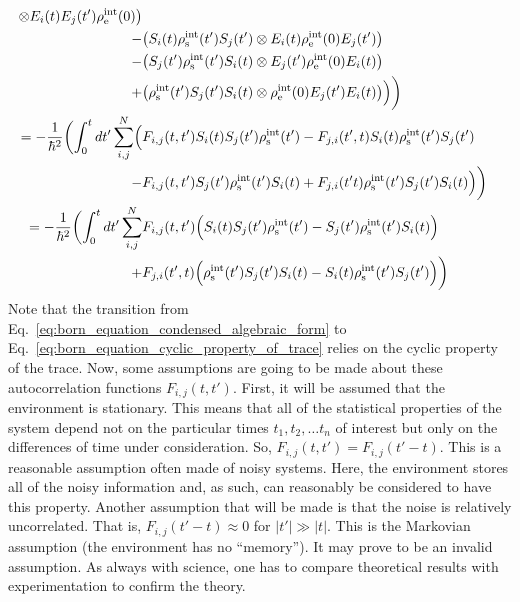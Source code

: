 \documentclass{article}
\begin{document}
\begin{align}
          \otimes E_{i}(t) E_{j}(t') \rho^{\textrm{int}}_{\textrm{e}}(0) \bigr)
          \label{eq:born_equation_condensed_algebraic_form} \\
          -& \bigl( S_{i}(t) \rho^{\textrm{int}}_{\textrm{s}}(t') S_{j}(t')
         \otimes E_{i}(t) \rho^{\textrm{int}}_{\textrm{e}}(0) E_{j}(t') \bigr)
         \nonumber \\
         -& \bigl( S_{j}(t')\rho^{\textrm{int}}_{\textrm{s}}(t') S_{i}(t)
         \otimes E_{j}(t') \rho^{\textrm{int}}_{\textrm{e}}(0) E_{i}(t) \bigr)
         \nonumber \\
         +& \bigl( \rho^{\textrm{int}}_{\textrm{s}}(t') S_{j}(t') S_{i}(t)
         \otimes \rho^{\textrm{int}}_{\textrm{e}}(0) E_{j}(t') E_{i}(t) \bigr)
          \Bigr) \biggr) \nonumber \\
       = -\frac{1}{\hbar^{2}} \biggl( \int_{0}^{t} dt' \sum^{N}_{i,j}
          \Bigl(
             & F_{i,j}(t,t') S_{i}(t) S_{j}(t') \rho^{\textrm{int}}_{\textrm{s}}(t')
          - F_{j,i}(t',t) S_{i}(t) \rho^{\textrm{int}}_{\textrm{s}}(t') S_{j}(t')
          \label{eq:born_equation_cyclic_property_of_trace} \\
          -& F_{i,j}(t,t') S_{j}(t')\rho^{\textrm{int}}_{\textrm{s}}(t') S_{i}(t)
          + F_{j,i}(t't) \rho^{\textrm{int}}_{\textrm{s}}(t') S_{j}(t') S_{i}(t)
          \Bigr) \biggr) \nonumber \\
       = -\frac{1}{\hbar^{2}} \biggl( \int_{0}^{t} dt' \sum^{N}_{i,j}
          & F_{i,j}(t,t') \Bigl(
             S_{i}(t) S_{j}(t') \rho^{\textrm{int}}_{\textrm{s}}(t')
          - S_{j}(t')\rho^{\textrm{int}}_{\textrm{s}}(t') S_{i}(t)
       \Bigr) \\
       + & F_{j,i}(t',t) \Bigr(
          \rho^{\textrm{int}}_{\textrm{s}}(t') S_{j}(t') S_{i}(t)
          - S_{i}(t) \rho^{\textrm{int}}_{\textrm{s}}(t') S_{j}(t')
            \Bigr) \biggr) \nonumber
\end{align}
Note that the transition from
Eq.~\ref{eq:born_equation_condensed_algebraic_form} to
Eq.~\ref{eq:born_equation_cyclic_property_of_trace} relies on the cyclic
property of the trace. Now, some assumptions are going to be made about these
autocorrelation functions $ F_{i,j}(t,t') $. First, it will be assumed that the
environment is stationary. This means that all of the statistical properties of
the system depend not on the particular times $ t_{1}, t_{2}, \ldots t_{n} $ of
interest but only on the differences of time under consideration. So, $
F_{i,j}(t,t') = F_{i,j}(t'-t) $. This is a reasonable assumption often made of
noisy systems.  Here, the environment stores all of the noisy information and,
as such, can reasonably be considered to have this property. Another assumption
that will be made is that the noise is relatively uncorrelated. That is, $
F_{i,j}(t'-t) \approx 0 $ for $ \left| t' \right| \gg \left| t \right| $. This
is the Markovian assumption (the environment has no ``memory''). It may prove to
be an invalid assumption. As always with science, one has to compare theoretical results
with experimentation to confirm the theory.
\end{document}
